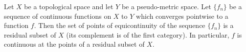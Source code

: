 Let $X$ be a topological space and let $Y$ be a pseudo-metric space. Let $\{f_n\}$ be a sequence of continuous functions on $X$ to $Y$ which converges pointwise to a function $f$. Then the set of points of equicontinuity of the sequence $\{f_n\}$ is a residual subset of $X$ (its complement is of the first category). In particular, $f$ is continuous at the points of a residual subset of $X$.
